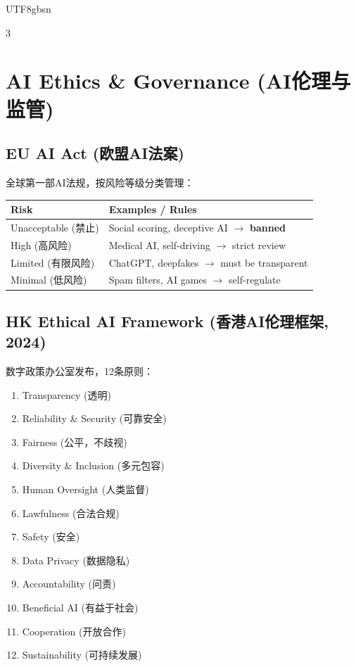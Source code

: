 \documentclass[10pt,landscape,a4paper]{article}
\newcommand{\zhint}[1]{{\scriptsize\color{gray!70!black}#1}}
\begin{document}
\begin{CJK}{UTF8}{gbsn}
\begin{multicols}{3}
\section{AI Ethics \& Governance \zhint{(AI伦理与监管)}}

\subsection{EU AI Act \zhint{(欧盟AI法案)}}
\zhint{全球第一部AI法规，按风险等级分类管理：}

\begin{center}
\scriptsize
\begin{tabular}{lp{4.2cm}}
\toprule
\textbf{Risk} & \textbf{Examples / Rules} \\
\midrule
Unacceptable \zhint{(禁止)} & Social scoring, deceptive AI $\to$ \textbf{banned} \\
High \zhint{(高风险)} & Medical AI, self-driving $\to$ strict review \\
Limited \zhint{(有限风险)} & ChatGPT, deepfakes $\to$ must be transparent \\
Minimal \zhint{(低风险)} & Spam filters, AI games $\to$ self-regulate \\
\bottomrule
\end{tabular}
\end{center}

\subsection{HK Ethical AI Framework \zhint{(香港AI伦理框架, 2024)}}
\zhint{数字政策办公室发布，12条原则：}

\begin{enumerate}[leftmargin=*, nosep, itemsep=0pt]
    \item Transparency \zhint{(透明)}
    \item Reliability \& Security \zhint{(可靠安全)}
    \item Fairness \zhint{(公平，不歧视)}
    \item Diversity \& Inclusion \zhint{(多元包容)}
    \item Human Oversight \zhint{(人类监督)}
    \item Lawfulness \zhint{(合法合规)}
    \item Safety \zhint{(安全)}
    \item Data Privacy \zhint{(数据隐私)}
    \item Accountability \zhint{(问责)}
    \item Beneficial AI \zhint{(有益于社会)}
    \item Cooperation \zhint{(开放合作)}
    \item Sustainability \zhint{(可持续发展)}
\end{enumerate}


\end{multicols}
\end{CJK}
\end{document}
